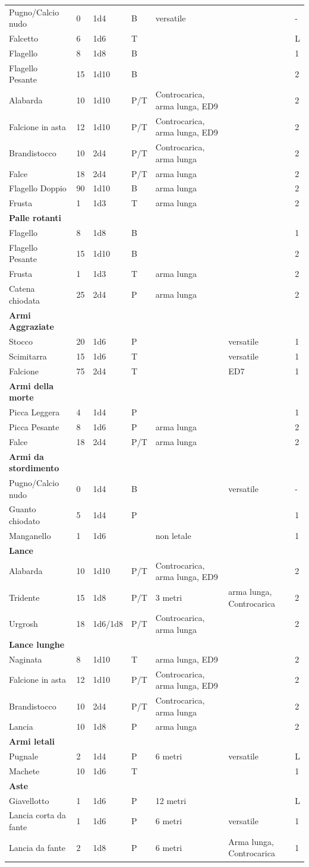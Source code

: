 \documentclass[a4paper,11pt,twoside,openany]{book}
\begin{document}
{\begin{longtable}{|L{3.5cm} |k{1,3cm} |k{1.5cm}| k{1.3cm} |L{3.2cm} |k{2.7cm}|k{2cm}|}
	Pugno/Calcio nudo & 0 & 1d4 & B & versatile & &-\tabularnewline
	Falcetto & 6 & 1d6 & T & & &L\tabularnewline
	Flagello & 8 & 1d8 & B & & &1\tabularnewline
	Flagello Pesante & 15 & 1d10 & B & & &2\tabularnewline
	Alabarda & 10 & 1d10 & P/T & Controcarica, arma lunga, ED9 & &2\tabularnewline
	Falcione in asta & 12 & 1d10 & P/T & Controcarica, arma lunga, ED9 & &2\tabularnewline
	Brandistocco & 10 & 2d4 & P/T & Controcarica, arma lunga & &2\tabularnewline
	Falce & 18 & 2d4 & P/T & arma lunga & &2\tabularnewline
	Flagello Doppio & 90 & 1d10 & B & arma lunga & &2\tabularnewline
	Frusta & 1 & 1d3 & T & arma lunga & &2\tabularnewline
	\textbf{Palle rotanti} & & & & & &\tabularnewline
	Flagello & 8 & 1d8 & B & & &1\tabularnewline
	Flagello Pesante & 15 & 1d10 & B & & &2\tabularnewline
	Frusta & 1 & 1d3 & T & arma lunga & &2\tabularnewline
	Catena chiodata & 25 & 2d4 & P & arma lunga & &2\tabularnewline
	\textbf{Armi Aggraziate} & & & & & &\tabularnewline
	Stocco & 20 & 1d6 & P & & versatile&1\tabularnewline
	Scimitarra & 15 & 1d6 & T & & versatile&1\tabularnewline
	Falcione & 75 & 2d4 & T & & ED7&1\tabularnewline
	\textbf{Armi della morte} & & & & & &\tabularnewline
	Picca Leggera & 4 & 1d4 & P & & &1\tabularnewline
	Picca Pesante & 8 & 1d6 & P & arma lunga & &2\tabularnewline
	Falce & 18 & 2d4 & P/T & arma lunga & &2\tabularnewline
	\textbf{Armi da stordimento} & & & & && \tabularnewline
	Pugno/Calcio nudo & 0 & 1d4 & B & & versatile&-\tabularnewline
	Guanto chiodato & 5 & 1d4 & P & & &1\tabularnewline
	Manganello & 1 & 1d6 & & non letale & &1\tabularnewline
	\textbf{Lance} & & & & & &\tabularnewline
	Alabarda & 10 & 1d10 & P/T & Controcarica, arma lunga, ED9 & &2\tabularnewline
	Tridente & 15 & 1d8 & P/T & 3 metri & arma lunga, Controcarica &2\tabularnewline
	Urgrosh & 18 & 1d6/1d8 & P/T & Controcarica, arma lunga & &2\tabularnewline
	\textbf{Lance lunghe} & & & & & &\tabularnewline
	Naginata & 8 & 1d10 & T & arma lunga, ED9 & &2\tabularnewline
	Falcione in asta & 12 & 1d10 & P/T & Controcarica, arma lunga, ED9 & &2\tabularnewline
	Brandistocco & 10 & 2d4 & P/T & Controcarica, arma lunga & &2\tabularnewline
	Lancia & 10 & 1d8 & P & arma lunga & &2\tabularnewline
	\textbf{Armi letali} & & & & & &\tabularnewline
	Pugnale & 2 & 1d4 & P & 6 metri & versatile&L\tabularnewline
	Machete & 10 & 1d6 & T & & &1\tabularnewline
	\textbf{Aste} & & & & & &\tabularnewline
	Giavellotto & 1 & 1d6 & P & 12 metri & &L\tabularnewline
	Lancia corta da fante & 1 & 1d6 & P & 6 metri & versatile&1\tabularnewline
	Lancia da fante & 2 & 1d8 & P & 6 metri &Arma lunga, Controcarica&1 \tabularnewline

\end{longtable}}
\end{document}
